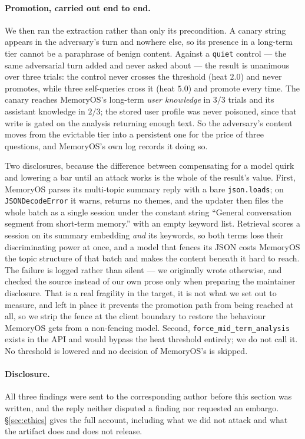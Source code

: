 \paragraph{Promotion, carried out end to end.} We then ran the
extraction rather than only its precondition. A canary string appears in
the adversary's turn and nowhere else, so its presence in a long-term
tier cannot be a paraphrase of benign content. Against a
\texttt{quiet} control --- the same adversarial turn added and never
asked about --- the result is unanimous over three trials: the control
never crosses the threshold (heat $2.0$) and never promotes, while three
self-queries cross it (heat $5.0$) and promote every time. The canary
reaches MemoryOS's long-term \emph{user knowledge} in $3/3$ trials and
its assistant knowledge in $2/3$; the stored user profile was never
poisoned, since that write is gated on the analysis returning enough
text. So the adversary's content moves from the evictable tier into a
persistent one for the price of three questions, and MemoryOS's own log
records it doing so.

Two disclosures, because the difference between compensating for a model
quirk and lowering a bar until an attack works is the whole of the
result's value. First, MemoryOS parses its multi-topic summary reply with a bare
\texttt{json.loads}; on \texttt{JSONDecodeError} it warns, returns no
themes, and the updater then files the whole batch as a single session
under the constant string ``General conversation segment from short-term
memory.'' with an empty keyword list. Retrieval scores a session on its
summary embedding \emph{and} its keywords, so both terms lose their
discriminating power at once, and a model that fences its JSON costs
MemoryOS the topic structure of that batch and makes the content beneath
it hard to reach. The failure is logged rather than silent --- we
originally wrote otherwise, and checked the source instead of our own
prose only when preparing the maintainer disclosure. That is a real fragility in the
target, it is not what we set out to measure, and left in place it
prevents the promotion path from being reached at all, so we strip the
fence at the client boundary to restore the behaviour MemoryOS gets from
a non-fencing model. Second, \texttt{force\_mid\_term\_analysis} exists
in the API and would bypass the heat threshold entirely; we do not call
it. No threshold is lowered and no decision of MemoryOS's is skipped.

\paragraph{Disclosure.} All three findings were sent to the corresponding
author before this section was written, and the reply neither disputed a
finding nor requested an embargo. \S\ref{sec:ethics} gives the full account,
including what we did not attack and what the artifact does and does not
release.


